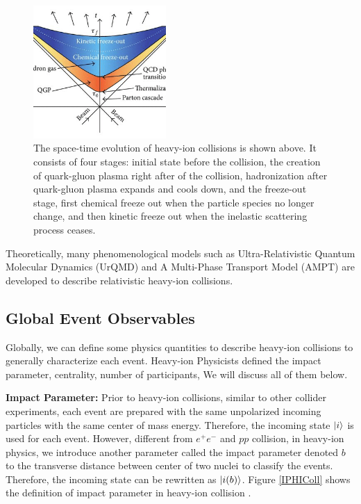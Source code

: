 \begin{figure}[hbtp]
\begin{center}
\includegraphics[width=0.45\textwidth]{Figures/Chapter1/HICSTEvolve.png}
\caption{The space-time evolution of heavy-ion collisions is shown above. It consists of four stages: initial state before the collision, the creation of quark-gluon plasma right after of the collision, hadronization after quark-gluon plasma expands and cools down, and the freeze-out stage, first chemical freeze out when the particle species no longer change, and then kinetic freeze out when the inelastic scattering process ceases.}
\label{CERNAccComplex}
\end{center}
\end{figure} 

Theoretically, many phenomenological models such as Ultra-Relativistic Quantum Molecular Dynamics (UrQMD) and A Multi-Phase Transport Model (AMPT) are developed to describe relativistic heavy-ion collisions. 


\subsection{Global Event Observables}

Globally, we can define some physics quantities to describe heavy-ion collisions to generally characterize each event. Heavy-ion Physicists defined the impact parameter, centrality, number of participants, We will discuss all of them below.

\textbf{Impact Parameter:} Prior to heavy-ion collisions, similar to other collider experiments, each event are prepared with the same unpolarized incoming particles with the same center of mass energy. Therefore, the incoming state $\ket{i}$ is used for each event. However, different from $e^+ e^-$ and $pp$ collision, in heavy-ion physics, we introduce another parameter called the impact parameter denoted $b$ to the transverse distance between center of two nuclei to classify the events. Therefore, the incoming state can be rewritten as  $\ket{i (b)}$. Figure \ref{IPHIColl} shows the definition of impact parameter in heavy-ion collision \cite{IPHICText}.

